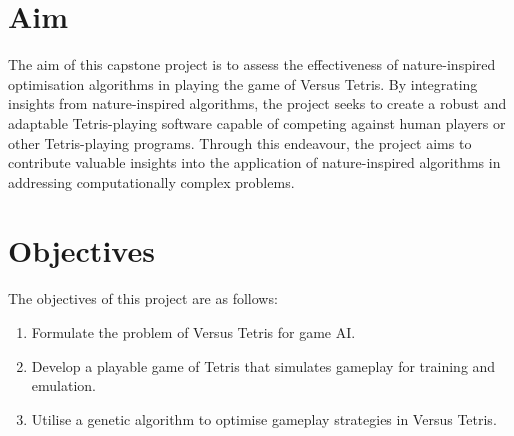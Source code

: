 \documentclass[a4paper, 12pt]{extreport}
\begin{document}
	\section{Aim}
	
	
	The aim of this capstone project is to assess the effectiveness of nature-inspired optimisation algorithms in playing the game of Versus Tetris. By integrating insights from nature-inspired algorithms, the project seeks to create a robust and adaptable Tetris-playing software capable of competing against human players or other Tetris-playing programs. Through this endeavour, the project aims to contribute valuable insights into the application of nature-inspired algorithms in addressing computationally complex problems.
	
	\section{Objectives}
	
	
	The objectives of this project are as follows:
	
	\begin{enumerate}
		\item Formulate the problem of Versus Tetris for game AI.
		\item Develop a playable game of Tetris that simulates gameplay for training and emulation.
		\item Utilise a genetic algorithm to optimise gameplay strategies in Versus Tetris.
	\end{enumerate}
	
\end{document}
